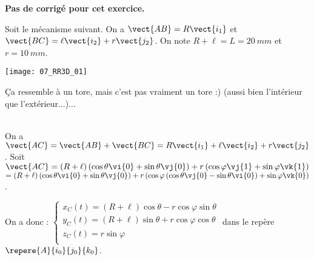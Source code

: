\normalfalse \difficiletrue \tdifficilefalse
\correctiontrue


\setcounter{numques}{0}
\ifcorrection
\else
\textbf{Pas de corrigé pour cet exercice.}
\fi

\ifprof
\else
Soit le mécanisme suivant. On a $\vect{AB}=R\vect{i_1}$ et $\vect{BC}=\ell\vect{i_2}+r\vect{j_2}$. On note $R+\ell=L = \SI{20}{mm}$ et $r=\SI{10}{mm}$.
\begin{center}
\texttt{[image: 07\_RR3D\_01]}
\end{center}
\fi


\ifprof
\else
{}
\fi

\ifprof
Ça ressemble à un tore, mais c'est pas vraiment un tore :) (aussi bien l'intérieur que l'extérieur...)...
\else
\fi

\ifprof ~\\
On a $\vect{AC}=\vect{AB}+\vect{BC} = R\vect{i_1} + \ell\vect{i_2}+r\vect{j_2}$. 
Soit $\vect{AC} = \left(R+\ell\right)\left(\cos\theta\vi{0} + \sin\theta\vj{0}\right)  + r\left(\cos\varphi \vj{1}+\sin\varphi \vk{1}\right)$  $= \left(R+\ell\right)\left(\cos\theta\vi{0} + \sin\theta\vj{0}\right)  + r\left(\cos\varphi \left(  \cos\theta\vj{0} - \sin\theta\vi{0}\right)+\sin\varphi \vk{0}\right)$.

On a donc :
$\left\{
\begin{array}{l}
x_C(t)= \left(R+\ell\right)\cos\theta  - r\cos\varphi  \sin\theta\\
y_C(t)= \left(R+\ell\right)\sin\theta  + r\cos\varphi \cos\theta \\
z_C(t)=  r\sin\varphi \\
\end{array}
\right.
$ dans le repère $\repere{A}{i_0}{j_0}{k_0}$.
\else
\fi

